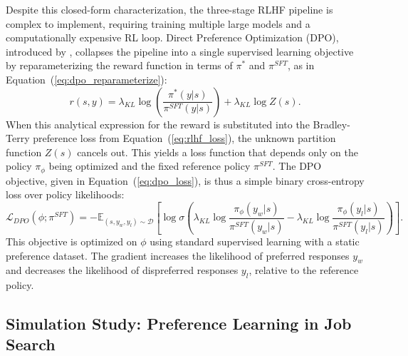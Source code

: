 Despite this closed-form characterization, the three-stage RLHF pipeline is complex to implement, requiring training multiple large models and a computationally expensive RL loop. Direct Preference Optimization (DPO), introduced by \citet{rafailov2023direct}, collapses the pipeline into a single supervised learning objective by reparameterizing the reward function in terms of $\pi^*$ and $\pi^{SFT}$, as in Equation~(\ref{eq:dpo_reparameterize}):
\begin{equation}
    r(s,y) = \lambda_{KL} \log\left(\frac{\pi^*(y|s)}{\pi^{SFT}(y|s)}\right) + \lambda_{KL} \log Z(s).
\label{eq:dpo_reparameterize}
\end{equation}
When this analytical expression for the reward is substituted into the Bradley-Terry preference loss from Equation~(\ref{eq:rlhf_loss}), the unknown partition function $Z(s)$ cancels out. This yields a loss function that depends only on the policy $\pi_\phi$ being optimized and the fixed reference policy $\pi^{SFT}$. The DPO objective, given in Equation~(\ref{eq:dpo_loss}), is thus a simple binary cross-entropy loss over policy likelihoods:
\begin{equation}
    \mathcal{L}_{DPO}(\phi; \pi^{SFT}) = -\mathbb{E}_{(s, y_w, y_l) \sim \mathcal{D}} \left[ \log \sigma \left( \lambda_{KL} \log \frac{\pi_\phi(y_w|s)}{\pi^{SFT}(y_w|s)} - \lambda_{KL} \log \frac{\pi_\phi(y_l|s)}{\pi^{SFT}(y_l|s)} \right) \right].
\label{eq:dpo_loss}
\end{equation}
This objective is optimized on $\phi$ using standard supervised learning with a static preference dataset. The gradient increases the likelihood of preferred responses $y_w$ and decreases the likelihood of dispreferred responses $y_l$, relative to the reference policy.


\subsection{Simulation Study: Preference Learning in Job Search}

